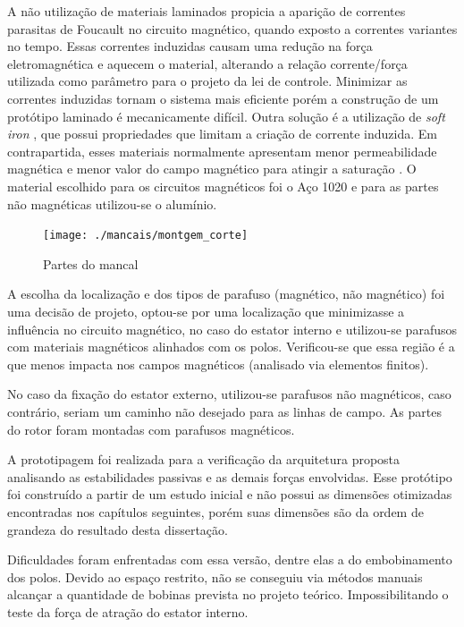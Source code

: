  
A não utilização de materiais laminados propicia a aparição de correntes parasitas de Foucault no circuito magnético, quando exposto a correntes variantes no tempo. Essas correntes induzidas  causam uma redução na força eletromagnética e aquecem o material, alterando a relação corrente/força utilizada como parâmetro para o projeto da lei de controle. Minimizar as correntes induzidas tornam o sistema mais eficiente porém a construção de um protótipo laminado é mecanicamente difícil. Outra solução é a utilização de \textit{soft iron} \citep{Boglietti2003}, que possui propriedades que limitam a criação de corrente induzida. Em contrapartida, esses materiais normalmente apresentam menor permeabilidade magnética e menor valor do campo magnético para atingir a saturação \citep{Han2013a}. O material escolhido para os circuitos magnéticos foi o Aço 1020 e para as partes não magnéticas utilizou-se o alumínio.
  
\begin{figure}[th!]
\centering
\texttt{[image: ./mancais/montgem\_corte]}
\caption{Partes do mancal}
\label{fig:montgem:corte}
\end{figure} 

A escolha da localização e dos tipos de parafuso (magnético, não magnético) foi uma decisão de projeto, optou-se por uma localização que minimizasse a influência no circuito magnético, no caso do estator interno e utilizou-se parafusos com materiais magnéticos alinhados com os polos. Verificou-se que essa região é a que menos impacta nos campos magnéticos (analisado via elementos finitos).

No caso da fixação do estator externo, utilizou-se parafusos não magnéticos, caso contrário, seriam um caminho não desejado para as linhas de campo. As partes do rotor foram montadas com parafusos magnéticos.

A prototipagem foi realizada para a verificação da arquitetura proposta analisando as estabilidades passivas e as demais forças envolvidas. Esse protótipo foi construído a partir de um estudo inicial e não possui as dimensões otimizadas encontradas nos capítulos seguintes, porém suas dimensões são da ordem de grandeza do resultado desta dissertação.

Dificuldades foram enfrentadas com essa versão, dentre elas a do embobinamento dos polos. Devido ao espaço restrito, não se conseguiu via métodos manuais alcançar a quantidade de bobinas prevista no projeto teórico. Impossibilitando o teste da força de atração do estator interno.

